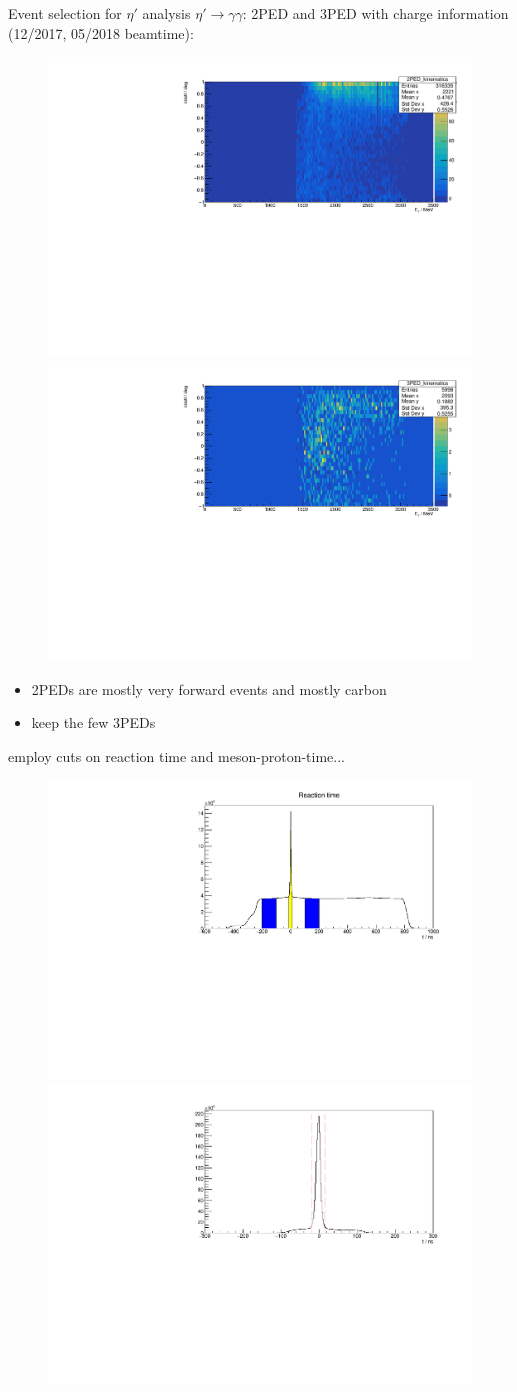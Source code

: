 \documentclass[11pt,aspectratio=1610,dvipsnames]{beamer}
\begin{document}
\begin{frame}{Event selection for $\eta'$ analysis }
	$\eta'\to\gamma\gamma$: 2PED and 3PED with charge information (12/2017, 05/2018 beamtime):
	\begin{figure}
		\centering
			\includegraphics[width=.49\linewidth]{../../figs/2PEDs.pdf}
		\includegraphics[width=.49\linewidth]{../../figs/3PEDs.pdf}
	\end{figure}
\begin{itemize}
 	\item 2PEDs are mostly very forward events  and mostly carbon 
 	\item keep the few 3PEDs
\end{itemize}
\end{frame}	
\begin{frame}{}
employ cuts on reaction time and meson-proton-time...
	\begin{figure}
		\centering
		\includegraphics[width=.49\linewidth]{../../figs/reaction_time_cut.pdf}
		\includegraphics[width=.49\linewidth]{../../figs/meson_time_cut.pdf}
	\end{figure}
\end{frame}	
\end{document}

